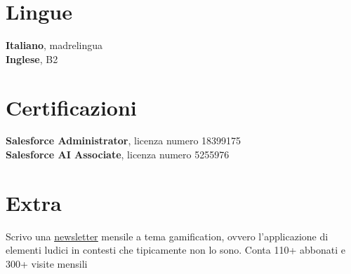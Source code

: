 \documentclass[letterpaper,11pt]{article}
\begin{document}
\section{Lingue}
 \begin{itemize}[leftmargin=0.15in, label={}]
    \small{\item{
     \textbf{Italiano}{, madrelingua} \\
     \textbf{Inglese}{, B2} 
    }}
 \end{itemize}


\section{Certificazioni}
 \begin{itemize}[leftmargin=0.15in, label={}]
    \small{\item{
     \textbf{Salesforce Administrator}{, licenza numero 18399175} \\
     \textbf{Salesforce AI Associate}{, licenza numero 5255976} 
    }}
 \end{itemize}
 
\section{Extra}
 \begin{itemize}[leftmargin=0.15in, label={}]
    \small{\item{{Scrivo una \href{https://giacomification.substack.com//}{\underline{newsletter}} mensile a tema gamification, ovvero l'applicazione di elementi ludici in contesti che tipicamente non lo sono. Conta 110+ abbonati e 300+ visite mensili }
    }}
 \end{itemize}

\end{document}
